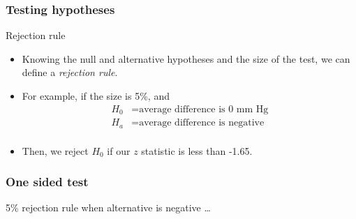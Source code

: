 \documentclass[handout]{beamer}
\begin{document}

   \begin{frame} \frametitle{Testing hypotheses}

   \begin{block}
   {Rejection rule}
   \begin{itemize}

   \item Knowing the null and alternative hypotheses and the size of the test,
   we can define a {\em \color{blue} rejection rule}.

   \item For example, if the size is 5\%, and
   $$
   \begin{aligned}
     H_0 &= \text{average difference is 0 mm Hg} \\
     H_a &= \text{average difference is negative} \\
   \end{aligned}
   $$
   \item Then, we reject $H_0$ if our $z$ statistic is
   less than {\color{blue} -1.65}.

   \end{itemize}
   \end{block}
   \end{frame}



   \begin{frame}
   \frametitle{One sided test}
   \begin{center}
   \end{center}
   {\color{blue} 5\% rejection rule} when alternative is negative \dots
   \end{frame}
\end{document}
